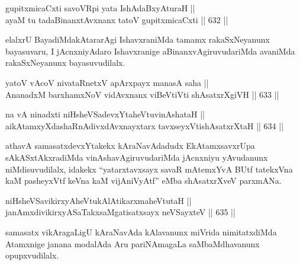
\begin{shl}
gupitxmicaCxti savoVR\s pi yata IshAdaBxyAturaH || \\
ayaM tu tadaBinanxtAvxnanx tatoV gupitxmicaCxti \hfill || 632 ||  
\end{shl}

\begin{artha}
elalxrU BayadiMdakAtararAgi IshavxraniMda tamamx rakaSxNeyanunx
bayasuvaru, I jAcnxniyAdaro Ishavxranige aBinanxvAgiruvudariMda
avaniMda rakaSxNeyanunx bayasuvudilalx.
\end{artha}


\begin{shl}
yatoV vAcoV nivataRnetxV apArxpayx manasA saha || \\
AnanadxM barxhamxNoV vidAvxnanx viBeVtiVti shAsatxrXgiVH \hfill || 633 ||  
\end{shl}


\begin{shl}
na vA ninadxti niHsheVSadevxYtaheVtuvinAshataH || \\
aikAtamxyXdashaRnAdivxdAvxnayxtarx tavxseyxVtishAsatxrXtaH \hfill || 634 ||  
\end{shl}

\begin{artha}
athavA samasatxdevxYtakekx kAraNavAdadudx EkAtamxsavxrUpa
sAkASxtAkxradiMda vinAshavAgiruvudariMda jAcnxniyu yAvudanunx
niMdisuvudilalx, idakekx ``yatarxtavxsayx savaR mAtemxYvA BUtf tatekxVna kaM pasheyxVtf keVna kaM vijAniVyAtf'' eMba shAsatxrXveV parxmANa.
\end{artha}


\begin{shl}
niHsheVSavikirxyAheVtukAlAtikarxmaheVtutaH || \\
janAmxdivikirxyASaTakxsaMgatisatxsayx neVSayxteV \hfill || 635 || 
\end{shl}

\begin{artha}
samasatx vikAragaLigU kAraNavAda kAlavanunx miVrida nimitatxdiMda
Atamxnige janana modalAda Aru pariNAmagaLa saMbaMdhavanunx
opupxvudilalx.
\end{artha}

